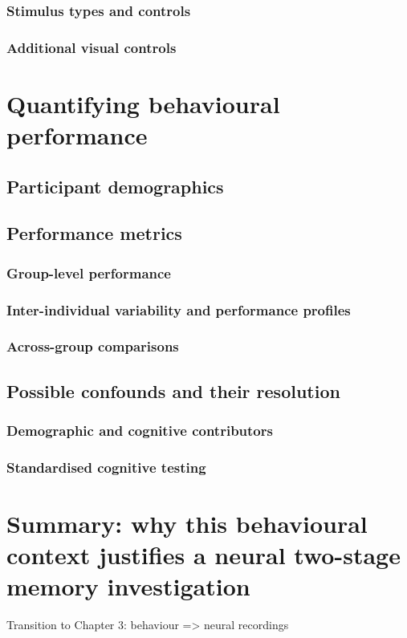 \documentclass[12pt,a4paper]{report}
\begin{document}
\subsubsection{Stimulus types and controls}
\subsubsection{Additional visual controls}

\section{Quantifying behavioural performance}
\subsection{Participant demographics}
\subsection{Performance metrics}
\subsubsection{Group-level performance}
\subsubsection{Inter-individual variability and performance profiles}
\subsubsection{Across-group comparisons} %
\subsection{Possible confounds and their resolution}
\subsubsection{Demographic and cognitive contributors} %
\subsubsection{Standardised cognitive testing} %

\section{Summary: why this behavioural context justifies a neural two-stage memory investigation}
Transition to Chapter 3: behaviour => neural recordings 
\end{document}
